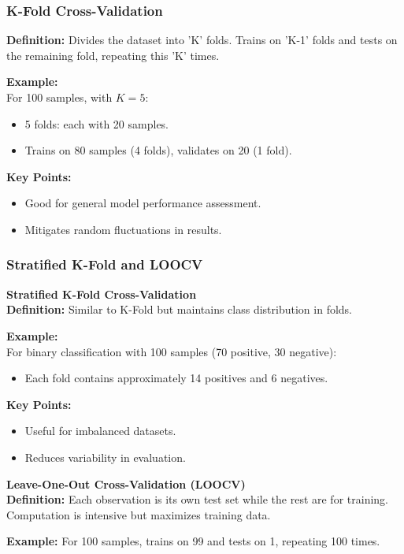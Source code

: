 \documentclass[aspectratio=169]{beamer}
\begin{document}
\begin{frame}[fragile]
    \frametitle{K-Fold Cross-Validation}
    \textbf{Definition:} Divides the dataset into 'K' folds. Trains on 'K-1' folds and tests on the remaining fold, repeating this 'K' times.
    
    \textbf{Example:} \\
    For 100 samples, with \( K=5 \):
    \begin{itemize}
        \item 5 folds: each with 20 samples.
        \item Trains on 80 samples (4 folds), validates on 20 (1 fold).
    \end{itemize}
    
    \textbf{Key Points:}
    \begin{itemize}
        \item Good for general model performance assessment.
        \item Mitigates random fluctuations in results.
    \end{itemize}
\end{frame}

\begin{frame}[fragile]
    \frametitle{Stratified K-Fold and LOOCV}
    \textbf{Stratified K-Fold Cross-Validation} \\
    \textbf{Definition:} Similar to K-Fold but maintains class distribution in folds.

    \textbf{Example:} \\
    For binary classification with 100 samples (70 positive, 30 negative):
    \begin{itemize}
        \item Each fold contains approximately 14 positives and 6 negatives.
    \end{itemize}
    
    \textbf{Key Points:}
    \begin{itemize}
        \item Useful for imbalanced datasets.
        \item Reduces variability in evaluation.
    \end{itemize}

    \textbf{Leave-One-Out Cross-Validation (LOOCV)} \\
    \textbf{Definition:} Each observation is its own test set while the rest are for training. Computation is intensive but maximizes training data.

    \textbf{Example:} For 100 samples, trains on 99 and tests on 1, repeating 100 times.
    
\end{frame}
\end{document}
